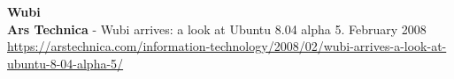 



\textcolor{sectcol}{\textbf{Wubi}}\\

\textbf{Ars Technica} - Wubi arrives: a look at Ubuntu 8.04 alpha 5. \hfill February 2008\\
\url{https://arstechnica.com/information-technology/2008/02/wubi-arrives-a-look-at-ubuntu-8-04-alpha-5/}\\


